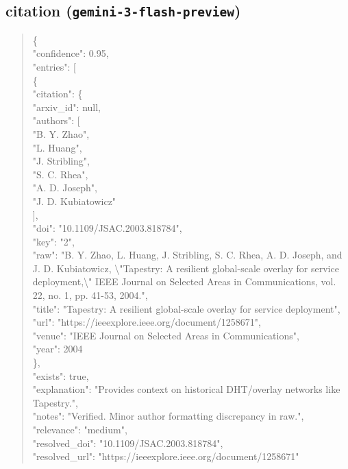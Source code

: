 \documentclass[11pt]{article}
\begin{document}
\subsection*{citation (\texttt{gemini-3-flash-preview})}
\begin{quote}\small\ttfamily\raggedright
\{\\
  "confidence": 0.95,\\
  "entries": [\\
    \{\\
      "citation": \{\\
        "arxiv\_id": null,\\
        "authors": [\\
          "B. Y. Zhao",\\
          "L. Huang",\\
          "J. Stribling",\\
          "S. C. Rhea",\\
          "A. D. Joseph",\\
          "J. D. Kubiatowicz"\\
        ],\\
        "doi": "10.1109/JSAC.2003.818784",\\
        "key": "2",\\
        "raw": "B. Y. Zhao, L. Huang, J. Stribling, S. C. Rhea, A. D. Joseph, and J. D. Kubiatowicz, \textbackslash{}"Tapestry: A resilient global-scale overlay for service deployment,\textbackslash{}" IEEE Journal on Selected Areas in Communications, vol. 22, no. 1, pp. 41-53, 2004.",\\
        "title": "Tapestry: A resilient global-scale overlay for service deployment",\\
        "url": "https://ieeexplore.ieee.org/document/1258671",\\
        "venue": "IEEE Journal on Selected Areas in Communications",\\
        "year": 2004\\
      \},\\
      "exists": true,\\
      "explanation": "Provides context on historical DHT/overlay networks like Tapestry.",\\
      "notes": "Verified. Minor author formatting discrepancy in raw.",\\
      "relevance": "medium",\\
      "resolved\_doi": "10.1109/JSAC.2003.818784",\\
      "resolved\_url": "https://ieeexplore.ieee.org/document/1258671"\\

\end{quote}
\end{document}
